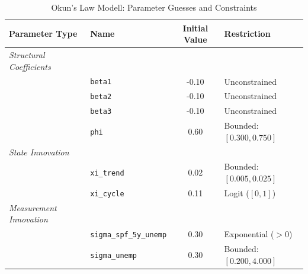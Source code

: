 \begin{table}[htbp]
\centering
\caption{Okun's Law Modell: Parameter Guesses and Constraints}
\label{tab:okun's_law_model_ssm_specs}
\begin{tabular}{llcl}
\hline\hline
\textbf{Parameter Type} & \textbf{Name} & \textbf{Initial Value} & \textbf{Restriction} \\ \hline
\textit{Structural Coefficients} &&& \\
    & \texttt{beta1} & -0.10 & Unconstrained \\
    & \texttt{beta2} & -0.10 & Unconstrained \\
    & \texttt{beta3} & -0.10 & Unconstrained \\
    & \texttt{phi} & 0.60 & Bounded: $[0.300, 0.750]$ \\
\hline
\textit{State Innovation} &&& \\
    & \texttt{xi\_trend} & 0.02 & Bounded: $[0.005, 0.025]$ \\
    & \texttt{xi\_cycle} & 0.11 & Logit ($[0, 1]$) \\
\hline
\textit{Measurement Innovation} &&& \\
    & \texttt{sigma\_spf\_5y\_unemp} & 0.30 & Exponential ($>0$) \\
    & \texttt{sigma\_unemp} & 0.30 & Bounded: $[0.200, 4.000]$ \\
\hline\hline
\end{tabular}
\end{table}
